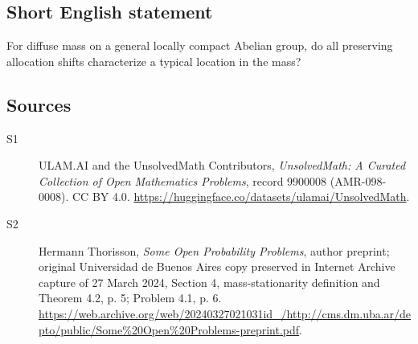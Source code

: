 \documentclass[11pt]{article}
\begin{document}
\subsection{Short English statement}
For diffuse mass on a general locally compact Abelian group, do all preserving allocation shifts characterize a typical location in the mass?
\subsection{Sources}
\begin{description}
\item[\hypertarget{source:9900008:1}{S1}] ULAM.AI and the UnsolvedMath Contributors, \emph{UnsolvedMath: A Curated Collection of Open Mathematics Problems}, record 9900008 (AMR-098-0008). CC BY 4.0. \url{https://huggingface.co/datasets/ulamai/UnsolvedMath}.
\item[\hypertarget{source:9900008:2}{S2}] Hermann Thorisson, \emph{Some Open Probability Problems}, author preprint; original Universidad de Buenos Aires copy preserved in Internet Archive capture of 27 March 2024, Section 4, mass-stationarity definition and Theorem 4.2, p. 5; Problem 4.1, p. 6. \url{https://web.archive.org/web/20240327021031id_/http://cms.dm.uba.ar/depto/public/Some%20Open%20Problems-preprint.pdf}.
\end{description}
\label{end:9900008}
\end{document}
